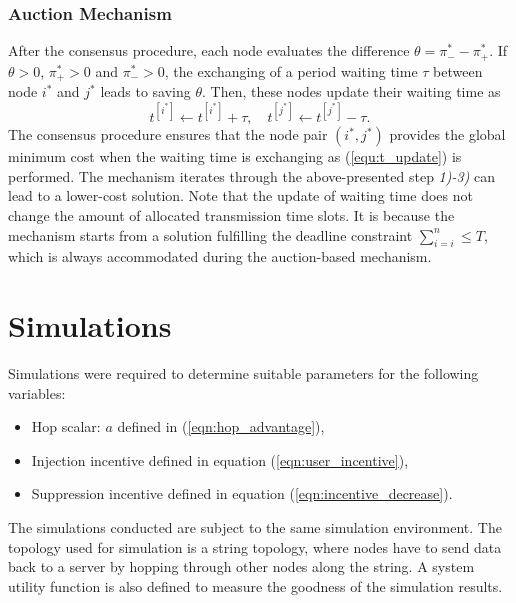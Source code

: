 \documentclass[journal]{IEEEtran}  %
\begin{document}
\subsubsection{Auction Mechanism}
After the consensus procedure, each node evaluates the difference $\theta =
\pi_-^*-\pi_+^*$.
If $\theta > 0$, $\pi_+^* >0$ and $\pi_-^* >0$, the exchanging of a period
waiting time $\tau$ between node $i^*$ and $j^*$ leads to saving $\theta$. 
Then, these nodes update their waiting time as 
\begin{equation}
t^{[i^*]} \leftarrow t^{[i^*]}+\tau, \quad t^{[j^*]} \leftarrow t^{[j^*]}- \tau. 
\label{equ:t_update}
\end{equation}
The consensus procedure ensures that the node pair $(i^*,j^*)$ provides the
global minimum cost when the waiting time is exchanging as (\ref{equ:t_update})
    is performed. 
The mechanism iterates through the above-presented step \textit{1)-3)} can lead
to a lower-cost solution. Note that the update of waiting time does not change
the amount of allocated transmission time slots. 
It is because the mechanism starts from a solution fulfilling the deadline 
constraint $\sum_{i=i}^n \leq T$, which is always accommodated during the 
auction-based mechanism.


\section{Simulations}
\label{sec:incsimulation}
Simulations were required to determine suitable parameters for the following
variables:
\begin{itemize}
\item Hop scalar: $a$ defined in  (\ref{eqn:hop_advantage}),
\item Injection incentive %
  defined in equation (\ref{eqn:user_incentive}),
\item Suppression incentive %
  defined in equation (\ref{eqn:incentive_decrease}).
\end{itemize}
The simulations conducted are subject to the same simulation environment. 
The topology used for simulation is a string topology, where nodes have to send
data back to a server by hopping through other nodes along the string. 
A system utility function is also defined to measure the goodness of the
simulation results.
\end{document}

